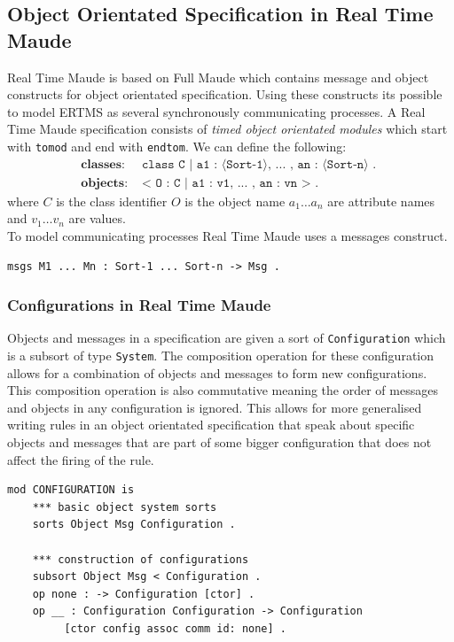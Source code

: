 \subsection{Object Orientated Specification in Real Time Maude}
Real Time Maude is based on Full Maude which contains message and object constructs for object orientated specification. Using these constructs its possible to model ERTMS as several synchronously communicating processes. A Real Time Maude specification consists of  \emph{timed object orientated modules} which start with \texttt{tomod} and end with \texttt{endtom}.
\medskip
We can define the following:
\begin{align*}
\textbf{classes}: & \texttt{ class C | a1 : ⟨Sort-1⟩, ... , an : ⟨Sort-n⟩ . } \\
\textbf{objects}: & \texttt{ < O : C | a1 : v1, ... , an : vn >  . } 
\end{align*}
where $C$ is the class identifier $O$ is the object name  $a_1 \ldots a_n$ are attribute names and $v_1 \ldots v_n$ are values. \\
\medskip
To model communicating processes Real Time Maude uses a messages construct.
\begin{center}
\verb|msgs M1 ... Mn : Sort-1 ... Sort-n -> Msg . | 
\end{center}


\subsubsection*{Configurations in Real Time Maude}
Objects and messages in a specification are given a sort of \texttt{Configuration} which is a subsort of type \texttt{System}. The composition operation for these configuration allows for a combination of objects and messages to form new configurations. This composition operation is also commutative meaning the order of messages and objects in any configuration is ignored. This allows for more generalised writing rules in an object orientated specification that speak about specific objects and messages that are part of some bigger configuration that does not affect the firing of the rule.

\begin{lstlisting}[caption = The Maude Configuration module]
mod CONFIGURATION is  
    *** basic object system sorts  
    sorts Object Msg Configuration .  
 
    *** construction of configurations  
    subsort Object Msg < Configuration .  
    op none : -> Configuration [ctor] .  
    op __ : Configuration Configuration -> Configuration  
         [ctor config assoc comm id: none] .
\end{lstlisting}



